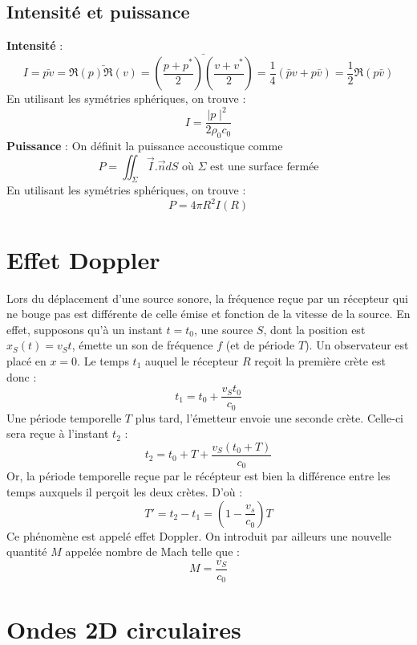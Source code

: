 \subsection{Intensité et puissance}
\noindent\textbf{Intensité} :
\[ I=\bar{pv}=\bar{\Re{(p)}\Re{(v)}}=\bar{\left(\frac{p+p^*}{2}\right)\left(\frac{v+v^*}{2}\right)}=\frac{1}{4}(\bar{p}v+p\bar{v})=\frac{1}{2}\Re(p\bar{v}) \]
En utilisant les symétries sphériques, on trouve :
\[ I=\frac{\mid p \mid^2}{2\rho_0c_0} \]
\textbf{Puissance} : On définit la puissance accoustique comme 
\[ P=\iint_\Sigma\vec{I}.\vec{n}dS \textrm{ où }\Sigma \textrm{ est une surface fermée} \]
En utilisant les symétries sphériques, on trouve :
\[ P=4\pi R^2I(R) \]

\section{Effet Doppler}
Lors du déplacement d'une source sonore, la fréquence reçue par un récepteur qui ne bouge pas est différente de celle émise et fonction de la vitesse de la source. En effet, supposons qu'à un instant $t=t_0$, une source $S$, dont la position est $x_S(t)=v_St$, émette un son de fréquence $f$ (et de période $T$). Un observateur est placé en $x=0$. Le temps $t_1$ auquel le récepteur $R$ reçoit la première crète est donc :
\[ t_1 = t_0+\frac{v_St_0}{c_0} \]
Une période temporelle $T$ plus tard, l'émetteur envoie une seconde crète. Celle-ci sera reçue à l'instant $t_2$ :
\[ t_2 = t_0+T+\frac{v_S(t_0+T)}{c_0} \]
Or, la période temporelle reçue par le récépteur est bien la différence entre les temps auxquels il perçoit les deux crètes. D'où :
\[ T'=t_2-t_1 = (1-\frac{v_s}{c_0})T \]
Ce phénomène est appelé effet Doppler. On introduit par ailleurs une nouvelle quantité $M$ appelée nombre de Mach telle que :
\[ M=\frac{v_S}{c_0} \]
\section{Ondes 2D circulaires}

